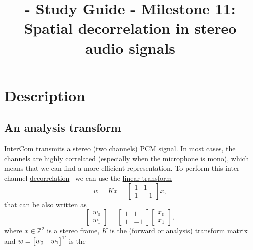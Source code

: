 
\title{\TM{} - Study Guide - Milestone 11: Spatial decorrelation in stereo audio signals}

\maketitle

\section{Description}

\subsection{An analysis transform}
InterCom transmits a
\href{https://en.wikipedia.org/wiki/Stereophonic_sound}{stereo} (two
channels)
\href{https://en.wikipedia.org/wiki/Pulse-code_modulation}{PCM
  signal}. In most cases, the channels are
\href{https://en.wikipedia.org/wiki/Binaural_recording}{highly
  correlated} (especially when the microphone is mono), which means
that we can find a more efficient representation. To perform this
inter-channel
\href{https://en.wikipedia.org/wiki/Decorrelation}{decorrelation}~\cite{thinkstats}
we can use the \href{https://en.wikipedia.org/wiki/Linear_map}{linear
  transform}~\cite{strang4linear}
\begin{equation}
  w = Kx = \begin{bmatrix} 1 & 1 \\ 1 & -1 \end{bmatrix}x,
  \label{eq:forward_transform_matrix_form}
\end{equation}
that can be also written as
\begin{equation}
  \begin{bmatrix}
    w_0 \\
    w_1
  \end{bmatrix}
  = 
  \begin{bmatrix} 1 & 1 \\ 1 & -1 \end{bmatrix}
  \begin{bmatrix}
    x_0 \\
    x_1
  \end{bmatrix},
  \label{eq:forward_transform_matrix_form2}
\end{equation}
where $x\in\mathbb{Z}^2$ is a stereo frame, $K$ is the (forward or
analysis) transform matrix and
$w=\begin{bmatrix} w_0 & w_1\end{bmatrix}^{\text T}$ is the

